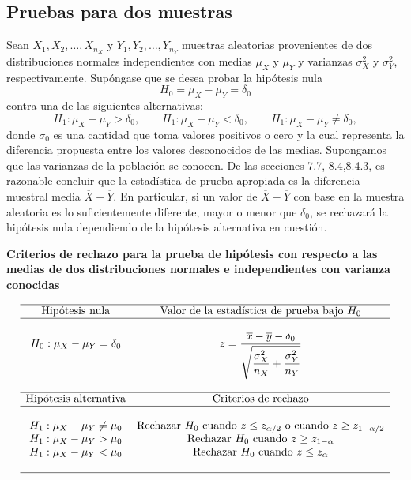 \subsection{Pruebas para dos muestras}
Sean $X_1,X_2,\ldots,X_{n_X}$ y $Y_1,Y_2,\ldots,Y_{n_Y}$ muestras aleatorias provenientes de dos distribuciones normales independientes con medias $\mu_X$ y $\mu_Y$ y varianzas $\sigma_X^2$ y $\sigma_Y^2$, respectivamente. Supóngase que se desea probar la hipótesis nula
$$H_0=\mu_X-\mu_Y=\delta_0$$
contra una de las siguientes alternativas:
$$H_1:\mu_X-\mu_Y>\delta_0,\qquad H_1:\mu_X-\mu_Y<\delta_0,\qquad H_1:\mu_X-\mu_Y\neq\delta_0,$$
donde $\sigma_0$ es una cantidad que toma valores positivos o cero y la cual representa  la diferencia propuesta entre los valores desconocidos de las medias. Supongamos que las varianzas de la población se conocen. De las secciones 7.7, 8.4,8.4.3, es razonable concluir que la estadística de prueba apropiada es la diferencia muestral media $\overline{X}-\overline{Y}$. En particular, si un valor de $\overline{X}-\overline{Y}$ con base en la muestra aleatoria es lo suficientemente diferente, mayor o menor que $\delta_0$, se rechazará la hipótesis nula dependiendo de la hipótesis alternativa en cuestión.

\begin{center}
\textbf{Criterios de rechazo para la prueba de hipótesis con respecto a las medias de dos distribuciones normales e independientes con varianza conocidas}
\end{center}
$$
\begin{array}{cc}
    \hline
    \mbox{Hipótesis nula} & \mbox{Valor de la estadística de prueba bajo } H_0\\
    \hline\\
    H_0: \mu_X-\mu_Y=\delta_0 & z=\dfrac{\overline{x}-\overline{y}-\delta_0}{\sqrt{\dfrac{\sigma_X^2}{n_X}+\dfrac{\sigma_Y^2}{n_Y}}}\\\\
    \hline
    \mbox{Hipótesis alternativa} & \mbox{Criterios de rechazo}\\
    \hline\\
    H_1:\mu_X-\mu_Y\neq \mu_0 & \mbox{Rechazar } H_0 \mbox{ cuando } z\leq z_{\alpha/2} \mbox{ o cuando } z\geq z_{1-\alpha/2}\\
    H_1:\mu_X-\mu_Y> \mu_0 & \mbox{Rechazar } H_0 \mbox{ cuando } z\geq z_{1-\alpha}\\
    H_1:\mu_X-\mu_Y< \mu_0 & \mbox{Rechazar } H_0 \mbox{ cuando } z\leq z_{\alpha}\\\\
    \hline
\end{array}
$$

